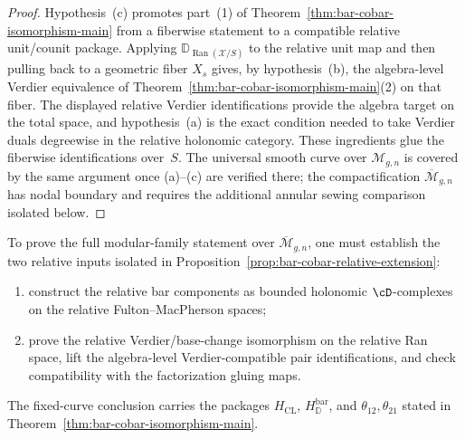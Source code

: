 \begin{proof}
Hypothesis~\textup{(c)} promotes part~\textup{(1)} of
Theorem~\ref{thm:bar-cobar-isomorphism-main} from a fiberwise
statement to a compatible relative unit/counit package. Applying
$\mathbb{D}_{\operatorname{Ran}(\mathcal{X}/S)}$ to the relative unit
map and then pulling back to a geometric fiber $X_s$ gives, by
hypothesis~\textup{(b)}, the algebra-level Verdier equivalence of
Theorem~\ref{thm:bar-cobar-isomorphism-main}\textup{(2)} on that
fiber. The displayed relative Verdier identifications provide the
algebra target on the total space, and hypothesis~\textup{(a)} is the
exact condition needed to take Verdier duals degreewise in the
relative holonomic category. These ingredients glue the fiberwise
identifications over~$S$. The universal smooth curve over
$\mathcal M_{g,n}$ is covered by the same argument once
\textup{(a)}--\textup{(c)} are verified there; the compactification
$\overline{\mathcal M}_{g,n}$ has nodal boundary and requires the
additional annular sewing comparison isolated below.
\end{proof}

\begin{remark}
\label{rem:bar-cobar-relative-theory}
To prove the full modular-family statement over
$\overline{\mathcal{M}}_{g,n}$, one must establish the two relative
inputs isolated in
Proposition~\ref{prop:bar-cobar-relative-extension}:
\begin{enumerate}[label=\textup{(\arabic*)}]
\item construct the relative bar components as bounded holonomic
 $\cD$-complexes on the relative Fulton--MacPherson spaces;
\item prove the relative Verdier/base-change isomorphism on the
 relative Ran space, lift the algebra-level Verdier-compatible pair
 identifications, and check compatibility with the factorization
 gluing maps.
\end{enumerate}
The fixed-curve conclusion carries the packages
$H_{\mathrm{CL}}$, $H_{\mathbb D}^{\mathrm{bar}}$, and
$\theta_{12},\theta_{21}$ stated in
Theorem~\ref{thm:bar-cobar-isomorphism-main}.
\end{remark}

